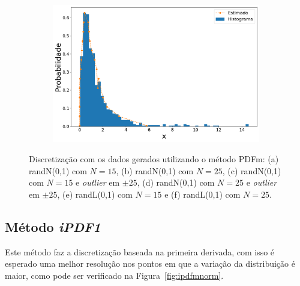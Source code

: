 \begin{figure}[H]
\begin{subfigure}[b]{0.45\textwidth}
		\includegraphics[width=\linewidth]{./figuras/PDFm_lognormal_25_1000_0}
		\caption{}
		\label{fig:pdfm_lognorm25_data}
	\end{subfigure}
	\caption{Discretização com os dados gerados utilizando o método \ac{PDFm}: (a) randN(0,1) com $N = 15$, (b) randN(0,1) com $N = 25$, (c) randN(0,1) com $N = 15$ e \textit{outlier} em $\pm 25$, (d) randN(0,1) com $N = 25$ e \textit{outlier} em $\pm 25$, (e) randL(0,1) com $ N = 15 $ e (f) randL(0,1) com $ N = 25 $.}
	\label{fig:pdfm_data}
\end{figure}

\subsection{Método \textit{iPDF1}}

Este método faz a discretização baseada na primeira derivada, com isso é esperado uma melhor resolução nos pontos em que a variação da distribuição é maior, como pode ser verificado na Figura~\ref{fig:ipdfmnorm}.%

